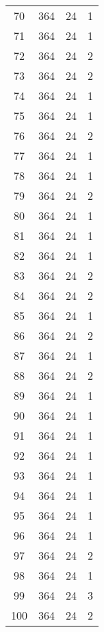\begin{longtable}[!]{c|ccc}
	70	& 364	& 24	& 1	\\
	71	& 364	& 24	& 1	\\
	72	& 364	& 24	& 2	\\
	73	& 364	& 24	& 2	\\
	74	& 364	& 24	& 1	\\
	75	& 364	& 24	& 1	\\
	76	& 364	& 24	& 2	\\
	77	& 364	& 24	& 1	\\
	78	& 364	& 24	& 1	\\
	79	& 364	& 24	& 2	\\
	80	& 364	& 24	& 1	\\
	81	& 364	& 24	& 1	\\
	82	& 364	& 24	& 1	\\
	83	& 364	& 24	& 2	\\
	84	& 364	& 24	& 2	\\
	85	& 364	& 24	& 1	\\
	86	& 364	& 24	& 2	\\
	87	& 364	& 24	& 1	\\
	88	& 364	& 24	& 2	\\
	89	& 364	& 24	& 1	\\
	90	& 364	& 24	& 1	\\
	91	& 364	& 24	& 1	\\
	92	& 364	& 24	& 1	\\
	93	& 364	& 24	& 1	\\
	94	& 364	& 24	& 1	\\
	95	& 364	& 24	& 1	\\
	96	& 364	& 24	& 1	\\
	97	& 364	& 24	& 2	\\
	98	& 364	& 24	& 1	\\
	99	& 364	& 24	& 3	\\
	100	& 364	& 24	& 2	\\
\end{longtable}


